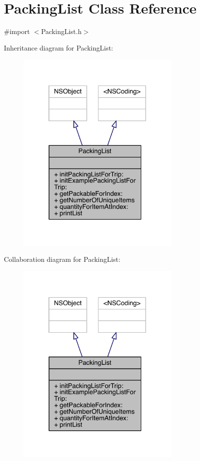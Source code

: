 \hypertarget{interface_packing_list}{\section{Packing\-List Class Reference}
\label{interface_packing_list}
}


{\ttfamily \#import $<$Packing\-List.\-h$>$}



Inheritance diagram for Packing\-List\-:\nopagebreak
\begin{figure}[H]
\begin{center}
\leavevmode
\includegraphics[width=229pt]{interface_packing_list__inherit__graph}
\end{center}
\end{figure}


Collaboration diagram for Packing\-List\-:\nopagebreak
\begin{figure}[H]
\begin{center}
\leavevmode
\includegraphics[width=229pt]{interface_packing_list__coll__graph}
\end{center}
\end{figure}
